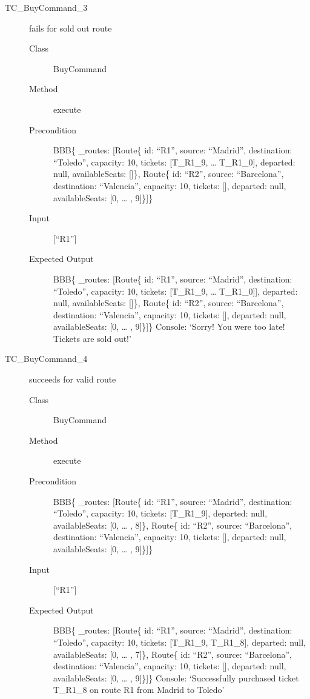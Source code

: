 \documentclass[11pt]{article}
\begin{document}
\begin{description}
\item[{TC\_BuyCommand\_3}] fails for sold out route
\begin{description}
\item[{Class}] BuyCommand
\item[{Method}] execute
\item[{Precondition}] BBB\{ \_routes: [Route\{ id: “R1”, source: “Madrid”, destination: “Toledo”, capacity: 10,  tickets: [T\_R1\_9, … T\_R1\_0], departed: null, availableSeats: []\}, Route\{ id: “R2”, source: “Barcelona”, destination: “Valencia”, capacity: 10,  tickets: [], departed: null, availableSeats: [0, … , 9]\}]\}
\item[{Input}] [“R1”]
\item[{Expected Output}] BBB\{ \_routes: [Route\{ id: “R1”, source: “Madrid”, destination: “Toledo”, capacity: 10,  tickets: [T\_R1\_9, … T\_R1\_0]], departed: null, availableSeats: []\}, Route\{ id: “R2”, source: “Barcelona”, destination: “Valencia”, capacity: 10,  tickets: [], departed: null, availableSeats: [0, … , 9]\}]\}
Console: ‘Sorry! You were too late! Tickets are sold out!’
\end{description}
\end{description}


\begin{description}
\item[{TC\_BuyCommand\_4}] succeeds for valid route
\begin{description}
\item[{Class}] BuyCommand
\item[{Method}] execute
\item[{Precondition}] BBB\{ \_routes: [Route\{ id: “R1”, source: “Madrid”, destination: “Toledo”, capacity: 10,  tickets: [T\_R1\_9], departed: null, availableSeats: [0, … , 8]\}, Route\{ id: “R2”, source: “Barcelona”, destination: “Valencia”, capacity: 10,  tickets: [], departed: null, availableSeats: [0, … , 9]\}]\}
\item[{Input}] [“R1”]
\item[{Expected Output}] BBB\{ \_routes: [Route\{ id: “R1”, source: “Madrid”, destination: “Toledo”, capacity: 10,  tickets: [T\_R1\_9, T\_R1\_8], departed: null, availableSeats: [0, … , 7]\}, Route\{ id: “R2”, source: “Barcelona”, destination: “Valencia”, capacity: 10,  tickets: [], departed: null, availableSeats: [0, … , 9]\}]\}
Console: ‘Successfully purchased ticket T\_R1\_8 on route R1 from Madrid to Toledo’
\end{description}
\end{description}
\end{document}
